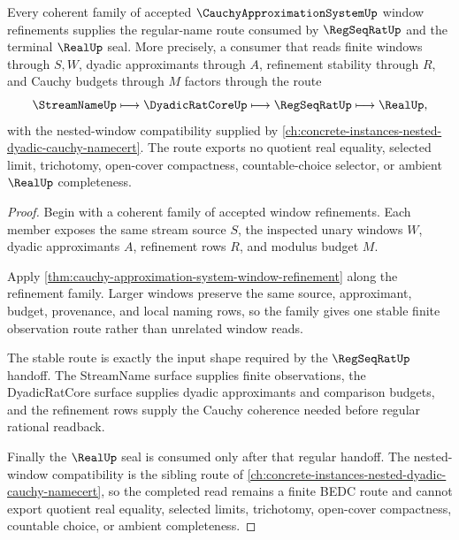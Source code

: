 \begin{theorem}
\label{thm:cauchy-approximation-system-regular-name-route}
Every coherent family of accepted $\CauchyApproximationSystemUp$ window refinements supplies the regular-name route consumed by $\RegSeqRatUp$ and the terminal $\RealUp$ seal. More precisely, a consumer that reads finite windows through $S,W$, dyadic approximants through $A$, refinement stability through $R$, and Cauchy budgets through $M$ factors through the route
$$
\StreamNameUp \longmapsto \DyadicRatCoreUp \longmapsto \RegSeqRatUp \longmapsto \RealUp ,
$$
with the nested-window compatibility supplied by \autoref{ch:concrete-instances-nested-dyadic-cauchy-namecert}. The route exports no quotient real equality, selected limit, trichotomy, open-cover compactness, countable-choice selector, or ambient $\RealUp$ completeness.
\end{theorem}
\begin{proof}
Begin with a coherent family of accepted window refinements. Each member exposes the same stream source $S$, the inspected unary windows $W$, dyadic approximants $A$, refinement rows $R$, and modulus budget $M$.

Apply \autoref{thm:cauchy-approximation-system-window-refinement} along the refinement family. Larger windows preserve the same source, approximant, budget, provenance, and local naming rows, so the family gives one stable finite observation route rather than unrelated window reads.

The stable route is exactly the input shape required by the $\RegSeqRatUp$ handoff. The StreamName surface supplies finite observations, the DyadicRatCore surface supplies dyadic approximants and comparison budgets, and the refinement rows supply the Cauchy coherence needed before regular rational readback.

Finally the $\RealUp$ seal is consumed only after that regular handoff. The nested-window compatibility is the sibling route of \autoref{ch:concrete-instances-nested-dyadic-cauchy-namecert}, so the completed read remains a finite BEDC route and cannot export quotient real equality, selected limits, trichotomy, open-cover compactness, countable choice, or ambient completeness.
\end{proof}


